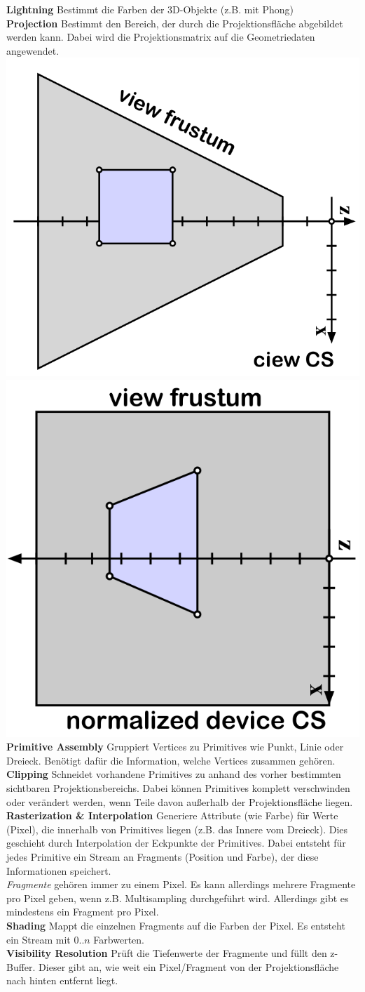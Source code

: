 \documentclass[12pt]{article}
\begin{document}
	\textbf{Lightning} Bestimmt die Farben der 3D-Objekte (z.B. mit Phong)\\
	\textbf{Projection} Bestimmt den Bereich, der durch die Projektionsfläche abgebildet werden kann. Dabei wird die Projektionsmatrix auf die Geometriedaten angewendet.\\
	\includegraphics[width=0.5\linewidth]{figures/rasterization-projection1.png}
	\includegraphics[width=0.5\linewidth]{figures/rasterization-projection2.png}\\
	\textbf{Primitive Assembly} Gruppiert Vertices zu Primitives wie Punkt, Linie oder Dreieck. Benötigt dafür die Information, welche Vertices zusammen gehören.\\
	\textbf{Clipping} Schneidet vorhandene Primitives zu anhand des vorher bestimmten sichtbaren Projektionsbereichs. Dabei können Primitives komplett verschwinden oder verändert werden, wenn Teile davon außerhalb der Projektionsfläche liegen.\\
	\textbf{Rasterization \& Interpolation} Generiere Attribute (wie Farbe) für Werte (Pixel), die innerhalb von Primitives liegen (z.B. das Innere vom Dreieck). Dies geschieht durch Interpolation der Eckpunkte der Primitives. Dabei entsteht für jedes Primitive ein Stream an Fragments (Position und Farbe), der diese Informationen speichert.\\
	\textit{Fragmente} gehören immer zu einem Pixel. Es kann allerdings mehrere Fragmente pro Pixel geben, wenn z.B. Multisampling durchgeführt wird. Allerdings gibt es mindestens ein Fragment pro Pixel.\\
	\textbf{Shading} Mappt die einzelnen Fragments auf die Farben der Pixel. Es entsteht ein Stream mit $0..n$ Farbwerten.\\
	\textbf{Visibility Resolution} Prüft die Tiefenwerte der Fragmente und füllt den z-Buffer. Dieser gibt an, wie weit ein Pixel/Fragment von der Projektionsfläche nach hinten entfernt liegt.
\end{document}
